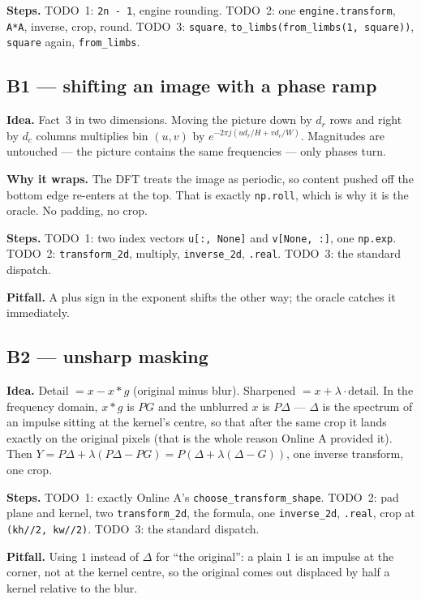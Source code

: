 \documentclass[11pt]{article}
\newcommand{\code}[1]{\texttt{#1}}
\begin{document}
\textbf{Steps.} TODO~1: \code{2n - 1}, engine rounding. TODO~2: one
\code{engine.transform}, \code{A*A}, inverse, crop, round. TODO~3:
\code{square}, \code{to\_limbs(from\_limbs(1, square))}, \code{square} again,
\code{from\_limbs}.

\subsection*{B1 --- shifting an image with a phase ramp}

\textbf{Idea.} Fact~3 in two dimensions. Moving the picture down by $d_r$ rows
and right by $d_c$ columns multiplies bin $(u, v)$ by
$e^{-2\pi j (u d_r / H + v d_c / W)}$. Magnitudes are untouched --- the picture
contains the same frequencies --- only phases turn.

\textbf{Why it wraps.} The DFT treats the image as periodic, so content pushed
off the bottom edge re-enters at the top. That is exactly \code{np.roll}, which
is why it is the oracle. No padding, no crop.

\textbf{Steps.} TODO~1: two index vectors \code{u[:, None]} and
\code{v[None, :]}, one \code{np.exp}. TODO~2: \code{transform\_2d}, multiply,
\code{inverse\_2d}, \code{.real}. TODO~3: the standard dispatch.

\textbf{Pitfall.} A plus sign in the exponent shifts the other way; the
oracle catches it immediately.

\subsection*{B2 --- unsharp masking}

\textbf{Idea.} Detail $= x - x * g$ (original minus blur). Sharpened
$= x + \lambda \cdot \text{detail}$. In the frequency domain, $x * g$ is $P G$
and the unblurred $x$ is $P \Delta$ --- $\Delta$ is the spectrum of an impulse
sitting at the kernel's centre, so that after the same crop it lands exactly on
the original pixels (that is the whole reason Online A provided it). Then
$Y = P\Delta + \lambda(P\Delta - PG) = P(\Delta + \lambda(\Delta - G))$, one
inverse transform, one crop.

\textbf{Steps.} TODO~1: exactly Online A's \code{choose\_transform\_shape}.
TODO~2: pad plane and kernel, two \code{transform\_2d}, the formula, one
\code{inverse\_2d}, \code{.real}, crop at \code{(kh//2, kw//2)}. TODO~3: the
standard dispatch.

\textbf{Pitfall.} Using $1$ instead of $\Delta$ for ``the original'': a plain
$1$ is an impulse at the corner, not at the kernel centre, so the original
comes out displaced by half a kernel relative to the blur.
\end{document}
